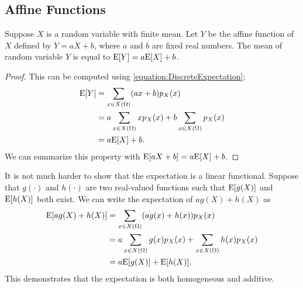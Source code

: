 \subsection{Affine Functions}

\begin{proposition}
Suppose $X$ is a random variable with finite mean.
Let $Y$ be the affine function of $X$ defined by $Y = aX + b$, where $a$ and $b$ are fixed real numbers.
The mean of random variable $Y$ is equal to $\mathrm{E} [Y] = a \mathrm{E} [X] + b$.
\end{proposition}
\begin{proof}
This can be computed using \eqref{equation:DiscreteExpectation};
\begin{equation*}
\begin{split}
\mathrm{E} [Y] &= \sum_{x \in X(\Omega)} (ax + b) p_X(x) \\
&= a \sum_{x \in X(\Omega)} x p_X(x) + b \sum_{x \in X(\Omega)} p_X(x) \\
&= a \mathrm{E} [X] + b.
\end{split}
\end{equation*}
We can summarize this property with $\mathrm{E} [a X + b] = a \mathrm{E} [X] + b$.
\end{proof}

It is not much harder to show that the expectation is a linear functional.
Suppose that $g(\cdot)$ and $h(\cdot)$ are two real-valued functions such that $\mathrm{E} [g(X)]$ and $\mathrm{E} [h(X)]$ both exist.
We can write the expectation of $a g(X) + h(X)$ as
\begin{equation*}
\begin{split}
\mathrm{E} [ a g(X) + h(X) ] &= \sum_{x \in X(\Omega)} (a g(x) + h(x)) p_X(x) \\
&= a \sum_{x \in X(\Omega)} g(x) p_X(x) + \sum_{x \in X(\Omega)} h(x) p_X(x) \\
&= a \mathrm{E} [g(X)] + \mathrm{E} [h(X)] .
\end{split}
\end{equation*}
This demonstrates that the expectation is both homogeneous and additive.

